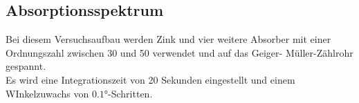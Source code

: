 \subsection{Absorptionsspektrum}

Bei diesem Versuchsaufbau werden Zink und vier weitere Absorber
mit einer Ordnungszahl zwischen 30 und 50 verwendet und auf das Geiger-
Müller-Zählrohr gespannt.\\
Es wird eine Integrationszeit von 20 Sekunden eingestellt und einem WInkelzuwachs
von $0.1 \si{\degree}$-Schritten.

